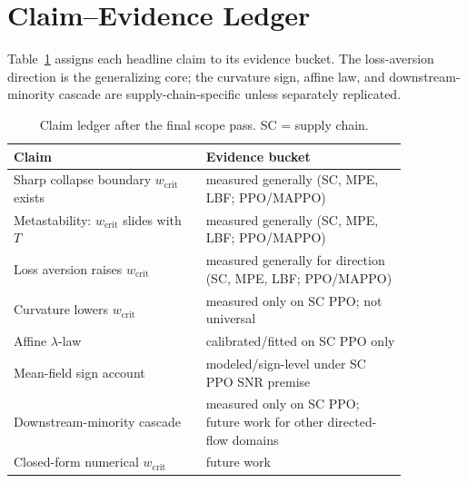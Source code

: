 \documentclass[letterpaper]{article} %
\theoremstyle{plain}
\newcommand{\wcrit}{w_{\mathrm{crit}}}
\begin{document}
\section{Claim--Evidence Ledger}
\label{sec:s_ledger}

Table~\ref{tab:claim_ledger} assigns each headline claim to its evidence bucket. The loss-aversion
direction is the generalizing core; the curvature sign, affine law, and downstream-minority cascade
are supply-chain-specific unless separately replicated.

\begin{table}[h]
\centering \small
\caption{Claim ledger after the final scope pass. SC = supply chain.}
\label{tab:claim_ledger}
\begin{tabular}{p{0.42\linewidth}p{0.44\linewidth}}
\toprule
Claim & Evidence bucket \\
\midrule
Sharp collapse boundary $\wcrit$ exists & measured generally (SC, MPE, LBF; PPO/MAPPO) \\
Metastability: $\wcrit$ slides with $T$ & measured generally (SC, MPE, LBF; PPO/MAPPO) \\
Loss aversion raises $\wcrit$ & measured generally for direction (SC, MPE, LBF; PPO/MAPPO) \\
Curvature lowers $\wcrit$ & measured only on SC PPO; not universal \\
Affine $\lambda$-law & calibrated/fitted on SC PPO only \\
Mean-field sign account & modeled/sign-level under SC PPO SNR premise \\
Downstream-minority cascade & measured only on SC PPO; future work for other directed-flow domains \\
Closed-form numerical $\wcrit$ & future work \\
\bottomrule
\end{tabular}
\end{table}


\end{document}

